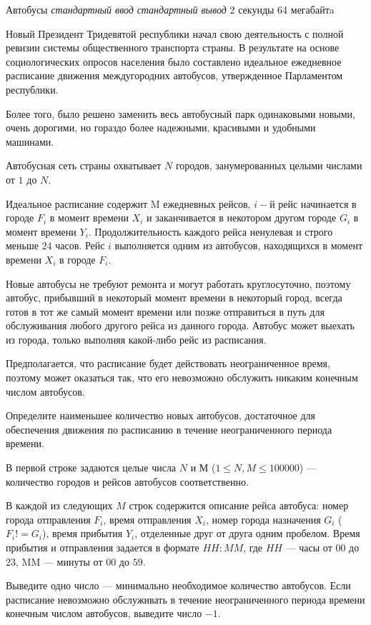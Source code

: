\begin{problem}%
{Автобусы}%
{\textsl{стандартный ввод}}%
{\textsl{стандартный вывод}}%
{2 секунды}%
{64 мегабайтa}{}

Новый Президент Тридевятой республики начал свою деятельность с полной ревизии системы общественного транспорта страны. В результате на основе социологических опросов населения было составлено идеальное ежедневное расписание движения междугородних автобусов, утвержденное Парламентом республики.

Более того, было решено заменить весь автобусный парк одинаковыми новыми, очень дорогими, но гораздо более надежными, красивыми и удобными машинами.

Автобусная сеть страны охватывает $N$ городов, занумерованных целыми числами от $1$ до $N$.

Идеальное расписание содержит M ежедневных рейсов, $i-й$ рейс начинается в городе $F_i$ в момент времени $X_i$ и заканчивается в некотором другом городе $G_i$ в момент времени $Y_i$. Продолжительность каждого рейса ненулевая и строго меньше $24$ часов. Рейс $i$ выполняется одним из автобусов, находящихся в момент времени $X_i$ в городе $F_i$.

Новые автобусы не требуют ремонта и могут работать круглосуточно, поэтому автобус, прибывший в некоторый момент времени в некоторый город, всегда готов в тот же самый момент времени или позже отправиться в путь для обслуживания любого другого рейса из данного города. Автобус может выехать из города, только выполняя какой-либо рейс из расписания.

Предполагается, что расписание будет действовать неограниченное время, поэтому может оказаться так, что его невозможно обслужить никаким конечным числом автобусов.

Определите наименьшее количество новых автобусов, достаточное для обеспечения движения по расписанию в течение неограниченного периода времени.
\InputFile

В первой строке задаются целые числа $N$ и $М$ ($1 \le N, M \le 100 000$) — количество городов и рейсов автобусов соответственно.

В каждой из следующих $M$ строк содержится описание рейса автобуса: номер города отправления $F_i$, время отправления $X_i$, номер города назначения $G_i$ ($F_i != G_i$), время прибытия $Y_i$, отделенные друг от друга одним пробелом. Время прибытия и отправления задается в формате $HH:MM$, где $HH$ — часы от $00$ до $23$, MM — минуты от $00$ до $59$.

\OutputFile

Выведите одно число — минимально необходимое количество автобусов. Если расписание невозможно обслуживать в течение неограниченного периода времени конечным числом автобусов, выведите число $-1$.

\Examples

\begin{example}
%
\end{example}
\end{problem}
